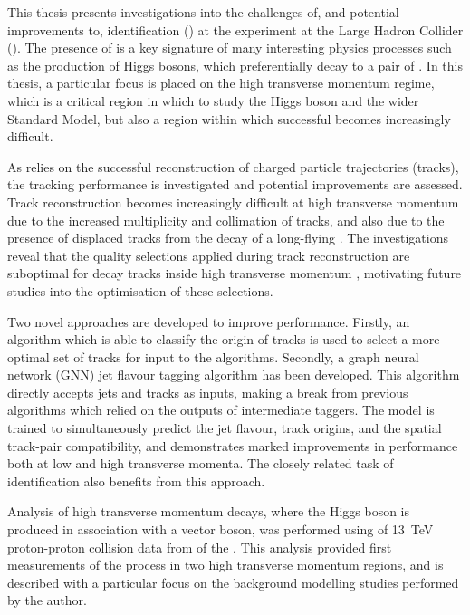 
This thesis presents investigations into the challenges of, and potential improvements to, \bjet identification (\btagging) at the \ATLAS experiment at the Large Hadron Collider (\LHC).
The presence of \bjets is a key signature of many interesting physics processes such as the production of Higgs bosons, which preferentially decay to a pair of \bquarks.
In this thesis, a particular focus is placed on the high transverse momentum regime, which is a critical region in which to study the Higgs boson and the wider Standard Model, but also a region within which successful \btagging becomes increasingly difficult.

As \btagging relies on the successful reconstruction of charged particle trajectories (tracks), the tracking performance is investigated and potential improvements are assessed.
Track reconstruction becomes increasingly difficult at high transverse momentum due to the increased multiplicity and collimation of tracks, and also due to the presence of displaced tracks from the decay of a long-flying \bhadron.
The investigations reveal that the quality selections applied during track reconstruction are suboptimal for \bhadron decay tracks inside high transverse momentum \bjets, motivating future studies into the optimisation of these selections.

Two novel approaches are developed to improve \btagging performance.
Firstly, an algorithm which is able to classify the origin of tracks is used to select a more optimal set of tracks for input to the \btagging algorithms.
Secondly, a graph neural network (GNN) jet flavour tagging algorithm has been developed.
This algorithm directly accepts jets and tracks as inputs, making a break from previous algorithms which relied on the outputs of intermediate taggers.
The model is trained to simultaneously predict the jet flavour, track origins, and the spatial track-pair compatibility, and demonstrates marked improvements in \btagging performance both at low and high transverse momenta.
The closely related task of \cjet identification also benefits from this approach.

Analysis of high transverse momentum \Hbb decays, where the Higgs boson is produced in association with a vector boson, was performed using \intlumi of \SI{13}{\TeV} proton-proton collision data from \runtwo of the \LHC.
This analysis provided first measurements of the \VHbb process in two high transverse momentum regions, and is described with a particular focus on the background modelling studies performed by the author.